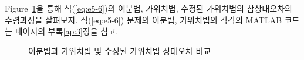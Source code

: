 Figure~\ref{fig:5-13}을 통해 식(\ref{eq:e5-6})의 이분법, 가위치법, 수정된 가위치법의 참상대오차의 수렴과정을 살펴보자.
식(\ref{eq:e5-6}) 문제의 이분법, 가위치법의 각각의 MATLAB 코드는 \pageref{ap:3}페이지의 부록\ref{ap:3}장을 참고.\\
\clearpage
\begin{figure}[!hbpt]
\centering
{}
\caption{이분법과 가위치법 및 수정된 가위치법 상대오차 비교}
\label{fig:5-13}
\end{figure}


